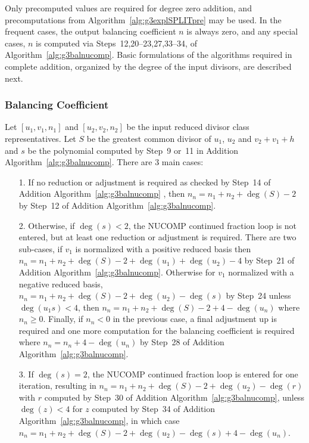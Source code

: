 Only precomputed values are required for degree zero addition, and
precomputations from Algorithm~\ref{alg:g3explSPLITpre} may be used. In the
frequent cases, the output balancing coefficient $n$ is always zero, and any
special cases, $n$ is computed via Steps~12,20--23,27,33--34, of
Algorithm~\ref{alg:g3balnucomp}. Basic formulations of the algorithms required
in complete addition, organized by the degree of the input divisors, are
described next. 

\subsubsection{Balancing Coefficient}\label{sec:g3expladd} 

Let $[u_1,v_1,n_1]$ and $[u_2,v_2,n_2]$ be the input reduced divisor class
representatives. Let $S$ be the greatest common divisor of $u_1$, $u_2$ and $v_2
+ v_1 + h$ and $s$ be the polynomial computed by Step~9 or~11 in Addition
Algorithm~\ref{alg:g3balnucomp}. There are 3 main cases:\begin{itemize}
    \item [1.] If no reduction or adjustment is required as checked by Step~14
    of Addition Algorithm~\ref{alg:g3balnucomp} , then $n_n = n_1 + n_2 +
    \deg(S) - 2$ by Step~12 of Addition Algorithm~\ref{alg:g3balnucomp}.
    \item [2.] Otherwise, if $\deg(s) < 2 $, the NUCOMP continued fraction loop
    is not entered, but at least one reduction or adjustment is required. There
    are two sub-cases, if $v_1$ is normalized with a positive reduced basis then
    $n_n = n_1 + n_2 + \deg(S) - 2 + \deg(u_1) + \deg(u_2) - 4$ by Step~21 of
    Addition Algorithm~\ref{alg:g3balnucomp}. Otherwise for $v_1$ normalized
    with a negative reduced basis, $n_n = n_1 + n_2 + \deg(S) - 2 + \deg(u_2) -
    \deg(s)$ by Step~24 unless $\deg(u_1s) < 4$, then $n_n = n_1 + n_2 + \deg(S)
    - 2 + 4 - \deg(u_n)$ where $n_n \geq 0$. Finally, if $n_n < 0$ in the
    previous case, a final adjustment up is required and  one more computation
    for the balancing coefficient is required where $n_n = n_n + 4 - \deg(u_n)$
    by Step~28 of Addition Algorithm~\ref{alg:g3balnucomp}.
    \item [3.] If $\deg(s) = 2$, the NUCOMP continued fraction loop is entered
    for one iteration, resulting in $n_n = n_1 + n_2 + \deg(S) - 2 + \deg(u_2) -
    \deg(r)$ with $r$ computed by Step~30 of Addition
    Algorithm~\ref{alg:g3balnucomp}, unless $\deg(z) < 4$ for $z$ computed by
    Step~34 of Addition Algorithm~\ref{alg:g3balnucomp}, in which case $n_n = n_1 + n_2 +
    \deg(S) - 2 + \deg(u_2) - \deg(s) + 4 - \deg(u_n)$.
\end{itemize}


